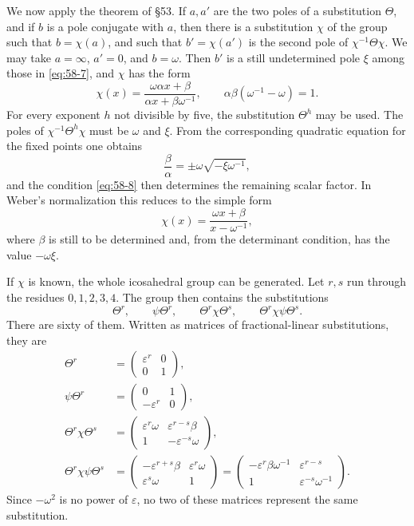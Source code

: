 \documentclass[11pt]{article}
\newcommand{\eps}{\varepsilon}
\begin{document}
We now apply the theorem of \S 53.  If \(a,a'\) are the two poles of a substitution \(\Theta\), and if \(b\) is a pole conjugate with \(a\), then there is a substitution \(\chi\) of the group such that \(b=\chi(a)\), and such that \(b'=\chi(a')\) is the second pole of \(\chi^{-1}\Theta\chi\).  We may take \(a=\infty\), \(a'=0\), and \(b=\omega\).  Then \(b'\) is a still undetermined pole \(\xi\) among those in \eqref{eq:58-7}, and \(\chi\) has the form
\begin{equation}\label{eq:58-8}
 \chi(x)=\frac{\omega\alpha x+\beta}{\alpha x+\beta\omega^{-1}},
 \qquad \alpha\beta(\omega^{-1}-\omega)=1.
\end{equation}
For every exponent \(h\) not divisible by five, the substitution \(\Theta^h\) may be used.  The poles of \(\chi^{-1}\Theta^h\chi\) must be \(\omega\) and \(\xi\).  From the corresponding quadratic equation for the fixed points one obtains
\[
 \frac{\beta}{\alpha}=\pm\omega\sqrt{-\xi\omega^{-1}},
\]
and the condition \eqref{eq:58-8} then determines the remaining scalar factor.  In Weber's normalization this reduces to the simple form
\begin{equation}\label{eq:58-9}
 \chi(x)=\frac{\omega x+\beta}{x-\omega^{-1}},
\end{equation}
where \(\beta\) is still to be determined and, from the determinant condition, has the value \(-\omega\xi\).

If \(\chi\) is known, the whole icosahedral group can be generated.  Let \(r,s\) run through the residues \(0,1,2,3,4\).  The group then contains the substitutions
\begin{equation}\label{eq:58-10}
 \Theta^r,
 \qquad \psi\Theta^r,
 \qquad \Theta^r\chi\Theta^s,
 \qquad \Theta^r\chi\psi\Theta^s.
\end{equation}
There are sixty of them.  Written as matrices of fractional-linear substitutions, they are
\begin{align}
 \Theta^r&=\begin{pmatrix}\eps^r&0\\0&1\end{pmatrix},\label{eq:58-11}\\
 \psi\Theta^r&=\begin{pmatrix}0&1\\-\eps^r&0\end{pmatrix},\label{eq:58-12}\\
 \Theta^r\chi\Theta^s
 &=\begin{pmatrix}\eps^r\omega&\eps^{r-s}\beta\\1&-\eps^{-s}\omega\end{pmatrix},\label{eq:58-13}\\
 \Theta^r\chi\psi\Theta^s
 &=\begin{pmatrix}-\eps^{r+s}\beta&\eps^r\omega\\ \eps^s\omega&1\end{pmatrix}
  =\begin{pmatrix}-\eps^r\beta\omega^{-1}&\eps^{r-s}\\1&\eps^{-s}\omega^{-1}\end{pmatrix}.
  \label{eq:58-14}
\end{align}
Since \(-\omega^2\) is no power of \(\eps\), no two of these matrices represent the same substitution.
\end{document}

